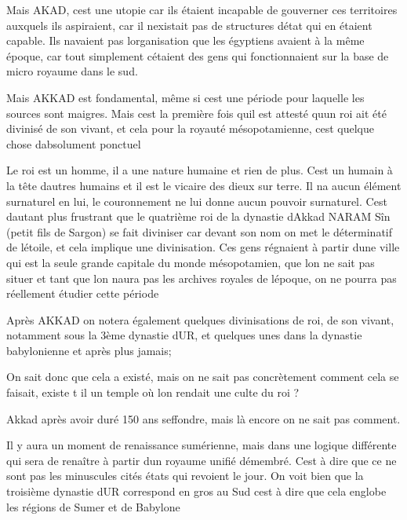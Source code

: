 \documentclass{article}
\begin{document}
Mais AKAD, c{\textquotesingle}est une utopie car ils étaient incapable
de gouverner ces territoires auxquels ils aspiraient, car il
n{\textquotesingle}existait pas de structures d{\textquotesingle}état
qui en étaient capable. Ils n{\textquotesingle}avaient pas
l{\textquotesingle}organisation que les égyptiens avaient à la même
époque, car tout simplement c{\textquotesingle}étaient des gens qui
fonctionnaient sur la base de micro royaume dans le sud.

Mais AKKAD est fondamental, même si c{\textquotesingle}est une période
pour laquelle les sources sont maigres. Mais c{\textquotesingle}est la
première fois qu{\textquotesingle}il est attesté qu{\textquotesingle}un
roi ait été divinisé de son vivant, et cela pour la royauté
mésopotamienne, c{\textquotesingle}est quelque chose
d{\textquotesingle}absolument ponctuel

Le roi est un homme, il a une nature humaine et rien de plus. 
C{\textquotesingle}est un humain à la tête d{\textquotesingle}autres
humains et il est le vicaire des dieux sur terre. Il
n{\textquotesingle}a aucun élément surnaturel en lui, le couronnement
ne lui donne aucun pouvoir surnaturel. C{\textquotesingle}est
d{\textquotesingle}autant plus frustrant que le quatrième roi de la
dynastie d{\textquotesingle}Akkad NARAM Sîn (petit fils de Sargon) se
fait diviniser car devant son nom on met le déterminatif de
l{\textquotesingle}étoile, et cela implique une divinisation. Ces gens
régnaient à partir d{\textquotesingle}une ville qui est la seule grande
capitale du monde mésopotamien, que l{\textquotesingle}on ne sait pas
situer et tant que l{\textquotesingle}on n{\textquotesingle}aura pas
les archives royales de l{\textquotesingle}époque, on ne pourra pas
réellement étudier cette période

Après AKKAD on notera également quelques divinisations de roi, de son
vivant, notamment sous la 3ème dynastie d{\textquotesingle}UR, et
quelques unes dans la dynastie babylonienne et après plus jamais;

On sait donc que cela a existé, mais on ne sait pas concrètement comment
cela se faisait, existe t il un temple où l{\textquotesingle}on rendait
une culte du roi ?

Akkad après avoir duré  150 ans s{\textquotesingle}effondre, mais là
encore on ne sait pas comment.

Il y aura un moment de renaissance sumérienne, mais dans une logique
différente qui sera de renaître à partir d{\textquotesingle}un royaume
unifié démembré. C{\textquotesingle}est à dire que ce ne sont pas les
minuscules cités états qui revoient le jour. On voit bien que la
troisième dynastie d{\textquotesingle}UR correspond en gros au Sud
c{\textquotesingle}est  à dire que cela englobe les régions de Sumer et
de Babylone
\end{document}
